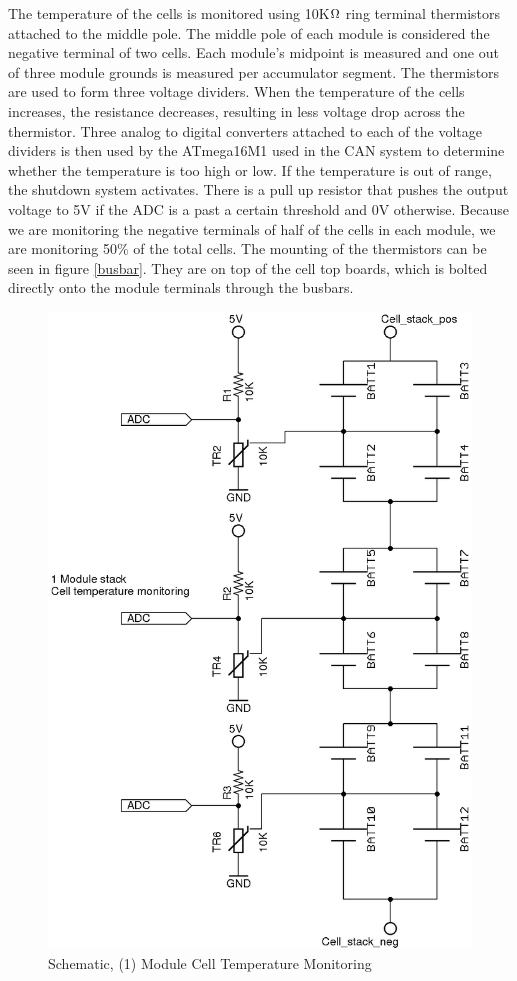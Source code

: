 \documentclass{article}
\begin{document}

            The temperature of the cells is monitored using 10K$\ohm$ ring terminal thermistors attached to the middle pole. The middle pole of each module is considered the negative terminal of two cells. Each module’s midpoint is measured and one out of three module grounds is measured per accumulator segment. The thermistors are used to form three voltage dividers. When the temperature of the cells increases, the resistance decreases, resulting in less voltage drop across the thermistor. Three analog to digital converters attached to each of the voltage dividers is then used by the ATmega16M1 used in the CAN system to determine whether the temperature is too high or low. If the temperature is out of range, the shutdown system activates. There is a pull up resistor that pushes the output voltage to 5V if the ADC is a past a certain threshold and 0V otherwise. Because we are monitoring the negative terminals of half of the cells in each module, we are monitoring 50\% of the total cells.
            The mounting of the thermistors can be seen in figure \ref{busbar}. They are on top of the cell top boards, which is bolted directly onto the module terminals through the busbars.


            \begin{figure}[H]
                \centering
                \includegraphics[width = 0.4 \textwidth]{celltemp}
                \caption{Schematic, (1) Module Cell Temperature Monitoring}
                \label{celltemp}
            \end{figure}
\end{document}
